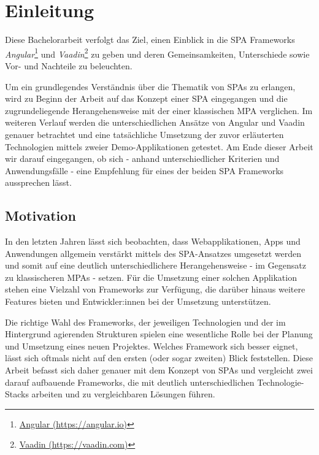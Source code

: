 \documentclass[a4paper,12pt,twoside]{scrreprt}
\begin{document}
\cleardoublepage
{}
\chapter{Einleitung}
\label{chap:einleitung}
Diese Bachelorarbeit verfolgt das Ziel, einen Einblick in die \ac{SPA} Frameworks \textit{Angular}\footnote{\href{https://angular.io/}{Angular (https://angular.io)}} und \textit{Vaadin}\footnote{\href{https://vaadin.com/}{Vaadin (https://vaadin.com)}} zu geben und deren Gemeinsamkeiten, Unterschiede sowie Vor- und Nachteile zu beleuchten.

\medskip

Um ein grundlegendes Verständnis über die Thematik von \acp{SPA} zu erlangen, wird zu Beginn der Arbeit auf das Konzept einer \ac{SPA} eingegangen und die zugrundeliegende Herangehensweise mit der einer klassischen \ac{MPA} verglichen. Im weiteren Verlauf werden die unterschiedlichen Ansätze von Angular und Vaadin genauer betrachtet und eine tatsächliche Umsetzung der zuvor erläuterten Technologien mittels zweier Demo-Applikationen getestet. Am Ende dieser Arbeit wir darauf eingegangen, ob sich - anhand unterschiedlicher Kriterien und Anwendungsfälle - eine Empfehlung für eines der beiden \ac{SPA} Frameworks aussprechen lässt.

\section{Motivation}
\label{sec:motivation}
In den letzten Jahren lässt sich beobachten, dass Webapplikationen, Apps und Anwendungen allgemein verstärkt mittels des \ac{SPA}-Ansatzes umgesetzt werden und somit auf eine deutlich unterschiedlichere Herangehensweise - im Gegensatz zu klassischeren \acp{MPA} - setzen. \parencite[][]{ismail_why_2019} Für die Umsetzung einer solchen Applikation stehen eine Vielzahl von Frameworks zur Verfügung, die darüber hinaus weitere Features bieten und Entwickler:innen bei der Umsetzung unterstützen.

\newpage

Die richtige Wahl des Frameworks, der jeweiligen Technologien und der im Hintergrund agierenden Strukturen spielen eine wesentliche Rolle bei der Planung und Umsetzung eines neuen Projektes. Welches Framework sich besser eignet, lässt sich oftmals nicht auf den ersten (oder sogar zweiten) Blick feststellen. Diese Arbeit befasst sich daher genauer mit dem Konzept von \acp{SPA} und vergleicht zwei darauf aufbauende Frameworks, die mit deutlich unterschiedlichen Technologie-Stacks arbeiten und zu vergleichbaren Lösungen führen.
\end{document}
